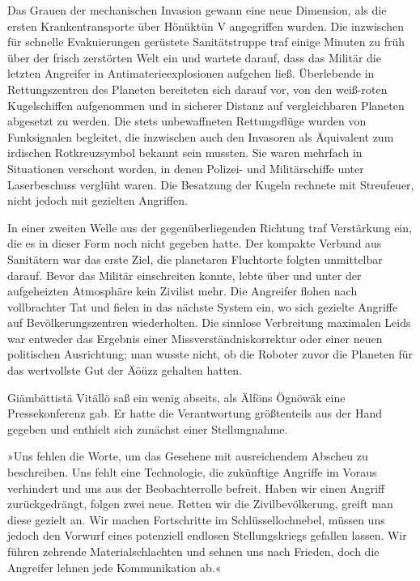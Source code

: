 Das Grauen der mechanischen Invasion gewann eine neue Dimension, als die ersten Krankentransporte über Hönüktün V angegriffen wurden. Die inzwischen für schnelle Evakuierungen gerüstete Sanitätstruppe traf einige Minuten zu früh über der frisch zerstörten Welt ein und wartete darauf, dass das Militär die letzten Angreifer in Antimaterieexplosionen aufgehen ließ. Überlebende in Rettungszentren des Planeten bereiteten sich darauf vor, von den weiß-roten Kugelschiffen aufgenommen und in sicherer Distanz auf vergleichbaren Planeten abgesetzt zu werden. Die stets unbewaffneten Rettungsflüge wurden von Funksignalen begleitet, die inzwischen auch den Invasoren als Äquivalent zum irdischen Rotkreuzsymbol bekannt sein mussten. Sie waren mehrfach in Situationen verschont worden, in denen Polizei- und Militärschiffe unter Laserbeschuss verglüht waren. Die Besatzung der Kugeln rechnete mit Streufeuer, nicht jedoch mit gezielten Angriffen.

In einer zweiten Welle aus der gegenüberliegenden Richtung traf Verstärkung ein, die es in dieser Form noch nicht gegeben hatte. Der kompakte Verbund aus Sanitätern war das erste Ziel, die planetaren Fluchtorte folgten unmittelbar darauf. Bevor das Militär einschreiten konnte, lebte über und unter der aufgeheizten Atmosphäre kein Zivilist mehr. Die Angreifer flohen nach vollbrachter Tat und fielen in das nächste System ein, wo sich gezielte Angriffe auf Bevölkerungszentren wiederholten. Die sinnlose Verbreitung maximalen Leids war entweder das Ergebnis einer Missverständniskorrektur oder einer neuen politischen Ausrichtung; man wusste nicht, ob die Roboter zuvor die Planeten für das wertvollste Gut der Äöüzz gehalten hatten.

Giämbättistä Vitällö saß ein wenig abseits, als Älföns Ögnöwäk eine Pressekonferenz gab. Er hatte die Verantwortung größtenteils aus der Hand gegeben und enthielt sich zunächst einer Stellungnahme.

»Uns fehlen die Worte, um das Gesehene mit ausreichendem Abscheu zu beschreiben. Uns fehlt eine Technologie, die zukünftige Angriffe im Voraus verhindert und uns aus der Beobachterrolle befreit. Haben wir einen Angriff zurückgedrängt, folgen zwei neue. Retten wir die Zivilbevölkerung, greift man diese gezielt an. Wir machen Fortschritte im Schlüssellochnebel, müssen uns jedoch den Vorwurf eines potenziell endlosen Stellungskriegs gefallen lassen. Wir führen zehrende Materialschlachten und sehnen uns nach Frieden, doch die Angreifer lehnen jede Kommunikation ab.«

